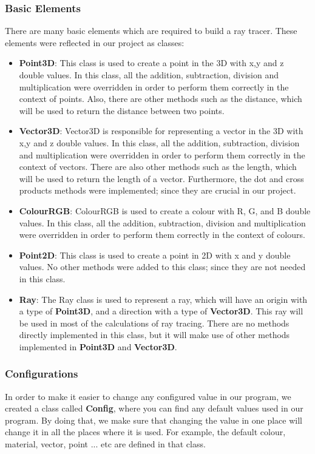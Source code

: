 \documentclass[a4paper]{report}
\begin{document}
	\subsubsection{Basic Elements}
	There are many basic elements which are required to build a ray tracer. These elements were reflected in our project as classes: 
	\begin{itemize}
		\item \textbf{Point3D}: This class is used to create a point in the 3D with x,y and z double values. In this class, all the addition, subtraction, division and multiplication were overridden in order to perform them correctly in the context of points. Also, there are other methods such as the distance, which will be used to return the distance between two points.
		\item \textbf{Vector3D}: Vector3D is responsible for representing a vector in the 3D with x,y and z double values. In this class, all the addition, subtraction, division and multiplication were overridden in order to perform them correctly in the context of vectors. There are also other methods such as the length, which will be used to return the length of a vector. Furthermore, the dot and cross products methods were implemented; since they are crucial in our project.
		\item \textbf{ColourRGB}: ColourRGB is used to create a colour with R, G, and B double values. In this class, all the addition, subtraction, division and multiplication were overridden in order to perform them correctly in the context of colours.
		\item \textbf{Point2D}: This class is used to create a point in 2D with x and y double values. No other methods were added to this class; since they are not needed in this class.
		\item \textbf{Ray}: The Ray class is used to represent a ray, which will have an origin with a type of \textbf{Point3D}, and a direction with a type of \textbf{Vector3D}. This ray will be used in most of the calculations of ray tracing. There are no methods directly implemented in this class, but it will make use of other methods implemented in \textbf{Point3D} and \textbf{Vector3D}.
	\end{itemize}
	\subsubsection{Configurations}
	In order to make it easier to change any configured value in our program, we created a class called \textbf{Config}, where you can find any default values used in our program. By doing that, we make sure that changing the value in one place will change it in all the places where it is used. For example, the default colour, material, vector, point ... etc are defined in that class. 
\end{document}
